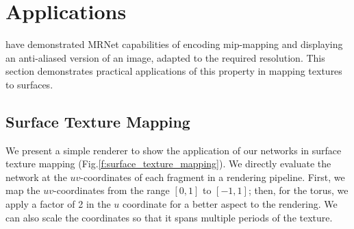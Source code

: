 



\section{Applications}\label{s-applications}


\citet{paz2022} have demonstrated MRNet capabilities of encoding mip-mapping and displaying an anti-aliased version of an image, adapted to the required resolution. This section demonstrates practical applications of this property in mapping textures to surfaces.

\subsection{Surface Texture Mapping}

We present a simple renderer to show the application of our networks in surface texture mapping (Fig.\ref{f:surface_texture_mapping}). We directly evaluate the network at the $uv$-coordinates of each fragment in a rendering pipeline. 
First, we map the $uv$-coordinates from the range $[0, 1]$ to  $[-1, 1]$; then, for the torus, we apply a factor of 2 in the $u$ coordinate for a better aspect to the rendering.
We can also scale the coordinates so that it spans multiple periods of the texture. 

